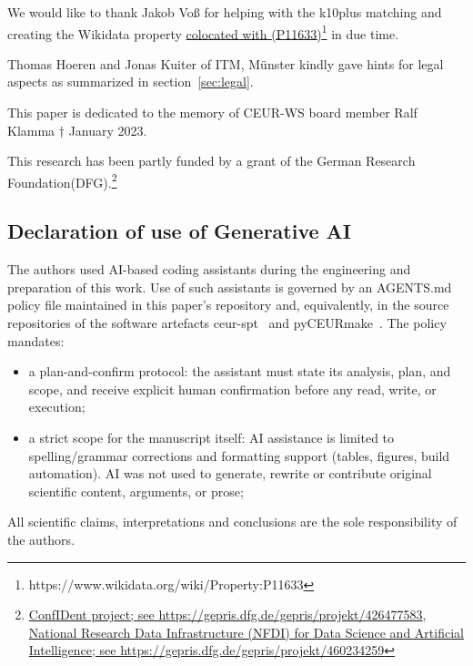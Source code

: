 \documentclass[runningheads]{llncs}
\newcommand{\footnotelink}[2]{\href{#1}{#2}\footnote{#1}}
\newcommand{\wdp}[2]{\footnotelink{https://www.wikidata.org/wiki/Property:#2}{#1 (#2)}}
\begin{document}
We would like to thank Jakob Vo{\ss} for helping with the k10plus matching and creating the Wikidata property \wdp{colocated with}{P11633} in due time.

Thomas Hoeren and Jonas Kuiter of ITM, M{\"u}nster kindly gave hints for legal aspects as summarized in section~\ref{sec:legal}.

This paper is dedicated to the memory of CEUR-WS board member Ralf Klamma $\dag$ January 2023.

This research has been partly funded by a grant of the German Research Foundation(DFG).\footnote{\href{https://gepris.dfg.de/gepris/projekt/426477583}{ConfIDent project; see https://gepris.dfg.de/gepris/projekt/426477583}, \href{https://gepris.dfg.de/gepris/projekt/460234259}{National Research Data Infrastructure (NFDI) for Data Science and Artificial Intelligence; see https://gepris.dfg.de/gepris/projekt/460234259}}

\subsection{Declaration of use of Generative AI}
The authors used AI-based coding assistants during the engineering and preparation of this work. Use of such assistants is governed by an AGENTS.md policy file maintained in this paper's repository and, equivalently, in the source repositories of the software artefacts ceur-spt~\cite{ceur-spt} and pyCEURmake~\cite{pyCEURmake}. The policy mandates:
\begin{itemize}
\item a plan-and-confirm protocol: the assistant must state its analysis, plan, and scope, and receive explicit human confirmation before any read, write, or execution;
\item a strict scope for the manuscript itself: AI assistance is limited to spelling/grammar corrections and formatting support (tables, figures, build automation). AI was not used to generate, rewrite or contribute original scientific content, arguments, or prose;
\end{itemize}
All scientific claims, interpretations and conclusions are the sole responsibility of the authors.



\end{document}
